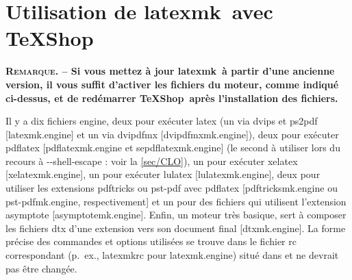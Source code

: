 \documentclass[11pt,french]{article}
\newcommand{\TS}{\textsf{\TeX Shop}}
\newcommand{\latexmk}{\textsf{latexmk}}
\newcommand{\cmd}[1]{\textsf{#1}}
\begin{document}
%
%


\section{Utilisation de \latexmk\ avec \TS}%

\noindent\textbf{\textsc{Remarque}. -- Si vous mettez à jour \latexmk\ à partir d'une ancienne version, il vous suffit d'activer les fichiers du moteur, comme indiqué ci-dessus, et de redémarrer \TS\ après l'installation des fichiers.}

Il y a dix fichiers \cmd{engine}, deux pour exécuter \cmd{latex} (un via \cmd{dvips} et \cmd{ps2pdf} [\cmd{latexmk.engine}] et un via \cmd{dvipdfmx} [\cmd{dvipdfmxmk.engine}]), deux pour exécuter \cmd{pdflatex} [\cmd{pdflatexmk.engine} et \cmd{sepdflatexmk.engine}] (le second à utiliser lors du recours à \cmd{-{}-shell-escape} : voir la \cref{sec/CLO}), un pour exécuter \cmd{xelatex} [\cmd{xelatexmk.engine}], un pour exécuter \cmd{lulatex} [\cmd{lulatexmk.engine}], deux pour utiliser les extensions \cmd{pdftricks} ou \cmd{pst-pdf} avec \cmd{pdflatex} [\cmd{pdftricksmk.engine} ou \cmd{pst-pdfmk.engine}, respectivement] et un pour des fichiers qui utilisent l'extension \cmd{asymptote} [\cmd{asymptotemk.engine}]. Enfin, un moteur très basique, sert à composer les fichiers \cmd{dtx} d'une extension vers son document final [\cmd{dtxmk.engine}]. La forme précise des commandes et options utilisées se trouve dans le fichier \cmd{rc} correspondant (p.~ex., \cmd{latexmkrc} pour \cmd{latexmk.engine}) situé dans  et ne devrait pas être changée.
\end{document}
